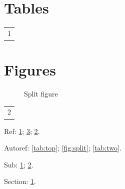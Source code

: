 \documentclass{article}
\begin{document}
\section{Tables}\label{sec:tab}
\begin{table}[h]
  \centering
  \label{tab:top}
  \begin{tabular}{c}1\end{tabular}
\end{table}
\section{Figures}
\begin{figure}[h]
  \centering
  \begin{subfigure}{.4\linewidth}\centering{}\label{fig:a}\end{subfigure}
  \begin{subfigure}{.4\linewidth}\centering{}\label{fig:b}\end{subfigure}
  \caption{Split figure}\label{fig:split}
\end{figure}
\begin{table}[h]
  \centering
  \label{tab:two}
  \begin{tabular}{c}2\end{tabular}
\end{table}

Ref: \ref{tab:top}; \ref{fig:split}; \ref{tab:two}.

Autoref: \autoref{tab:top}; \autoref{fig:split}; \autoref{tab:two}.

Sub: \ref{fig:a}; \ref{fig:b}.

Section: \ref{sec:tab}.
\end{document}
